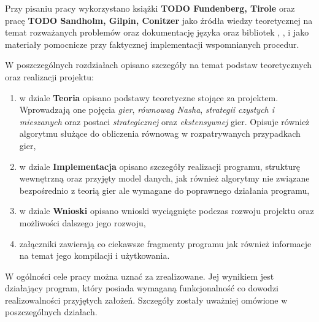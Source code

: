 \documentclass{standalone}
\begin{document}
Przy pisaniu pracy wykorzystano książki \textbf{TODO Fundenberg, Tirole} oraz pracę \textbf{TODO Sandholm, Gilpin, Conitzer} jako źródła wiedzy
teoretycznej na temat rozważanych problemów oraz dokumentację języka  oraz bibliotek , ,  i 
jako materiały pomocnicze przy faktycznej implementacji wspomnianych procedur.

W poszczególnych rozdziałach opisano szczegóły na temat podstaw teoretycznych oraz realizacji projektu:
\begin{enumerate}
\item w dziale \textbf{Teoria} opisano podstawy teoretyczne stojące za projektem. Wprowadzają one pojęcia \textit{gier}, \textit{równowag Nasha},
\textit{strategii czystych i mieszanych} oraz postaci \textit{strategicznej} oraz \textit{ekstensywnej} gier. Opisuje również algorytmu służące do
obliczenia równowag w rozpatrywanych przypadkach gier,
\item w dziale \textbf{Implementacja} opisano szczegóły realizacji programu, strukturę wewnętrzną oraz przyjęty model danych, jak również algorytmy
nie związane bezpośrednio z teorią gier ale wymagane do poprawnego działania programu,
\item w dziale \textbf{Wnioski} opisano wnioski wyciągnięte podczas rozwoju projektu oraz możliwości dalszego jego rozwoju,
\item załączniki zawierają co ciekawsze fragmenty programu jak również informacje na temat jego kompilacji i użytkowania.
\end{enumerate}

W ogólności cele pracy można uznać za zrealizowane. Jej wynikiem jest działający program, który posiada wymaganą funkcjonalność co dowodzi realizowalności
przyjętych założeń. Szczegóły zostały uważniej omówione w poszczególnych działach.
\end{document}
